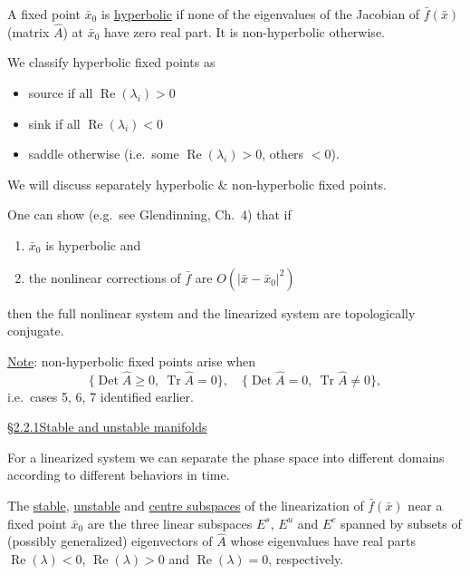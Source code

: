 \documentclass[11pt,a4paper]{article}
\begin{document}
\medskip
\noindent
A fixed point $\bar x_0$ is \underline{hyperbolic} if none of the eigenvalues
of the Jacobian of $\bar f(\bar x)$ (matrix $\hat A$) at $\bar x_0$ have zero
real part. It is non-hyperbolic otherwise.

\medskip
\noindent We classify hyperbolic fixed points as
\begin{itemize}
\setlength{\itemsep}{0pt}
\item[$(\ast)$] source if all $\operatorname{Re}(\lambda_i)>0$
\item[$(\ast)$] sink if all $\operatorname{Re}(\lambda_i)<0$
\item[$(\ast)$] saddle otherwise (i.e.\ some $\operatorname{Re}(\lambda_i)>0$, others $<0$).
\end{itemize}
\noindent
We will discuss separately hyperbolic \& non-hyperbolic fixed points.

\medskip
\noindent One can show (e.g.\ see Glendinning, Ch.\ 4) that if
\begin{enumerate}
\setlength{\itemsep}{0pt}
\item[(1)] $\bar x_0$ is hyperbolic and
\item[(2)] the nonlinear corrections of $\bar f$ are $O(|\bar x-\bar x_0|^2)$
\end{enumerate}
\noindent
then the full nonlinear system and the linearized system are topologically conjugate.

\medskip
\noindent\underline{Note}: non-hyperbolic fixed points arise when
\[
\{\operatorname{Det}\hat A\geq0,\ \operatorname{Tr}\hat A=0\},\quad
\{\operatorname{Det}\hat A=0,\ \operatorname{Tr}\hat A\neq0\},
\]
\noindent i.e.\ cases 5, 6, 7 identified earlier.

\newpage
\noindent\underline{\S 2.2.1\quad Stable and unstable manifolds}

\medskip
\noindent
For a linearized system we can separate the phase space into different domains
according to different behaviors in time.

\medskip
\noindent{}

\medskip
\noindent
The \underline{stable}, \underline{unstable} and \underline{centre subspaces}
of the linearization of $\bar f(\bar x)$ near a fixed point $\bar x_0$ are the
three linear subspaces $E^s$, $E^u$ and $E^c$ spanned by subsets of (possibly
generalized) eigenvectors of $\hat A$ whose eigenvalues have real parts
$\operatorname{Re}(\lambda)<0$, $\operatorname{Re}(\lambda)>0$ and
$\operatorname{Re}(\lambda)=0$, respectively.
\end{document}
